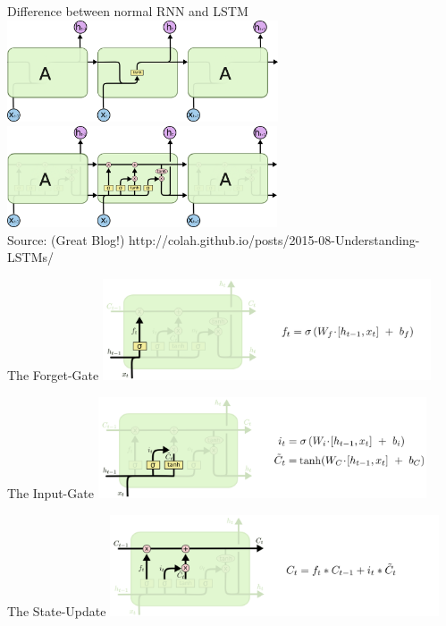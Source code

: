 \begin{frame}{Difference between normal RNN and LSTM}
\includegraphics[height=3.0cm]{data/LSTM3-SimpleRNN.png}\\ 
\includegraphics[height=3.0cm]{data/LSTM3-chain.png}\\
Source: (Great Blog!) http://colah.github.io/posts/2015-08-Understanding-LSTMs/ 
\end{frame}

\begin{frame}{The Forget-Gate}
\includegraphics[height=3.0cm]{data/LSTM3-focus-f.png}\\ 
\end{frame}

\begin{frame}{The Input-Gate}
\includegraphics[height=3.0cm]{data/LSTM3-focus-i.png}\\ 
\end{frame}

\begin{frame}{The State-Update}
\includegraphics[height=3.0cm]{data/LSTM3-focus-C.png}\\ 
\end{frame}

